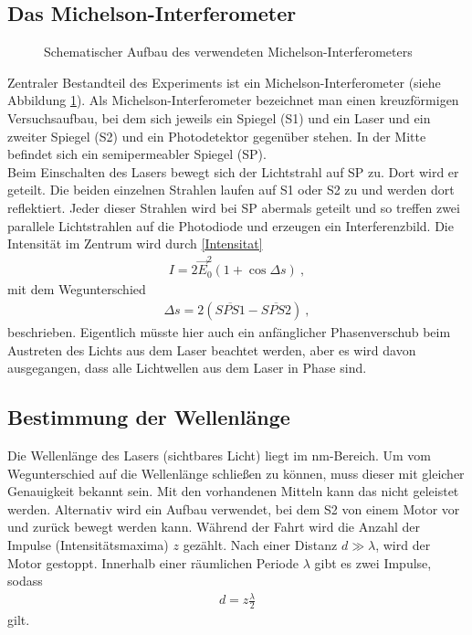\subsection*{Das Michelson-Interferometer}
\begin{figure}[h!]
	\centering
	
	\caption{Schematischer Aufbau des verwendeten Michelson-Interferometers}
	\label{fig:Interferometer}
\end{figure}
Zentraler Bestandteil des Experiments ist ein Michelson-Interferometer (siehe Abbildung \ref{fig:Interferometer}). Als Michelson-Interferometer bezeichnet man einen kreuzförmigen Versuchsaufbau, bei dem sich jeweils ein Spiegel (S1) und ein Laser und ein zweiter Spiegel (S2) und ein Photodetektor gegenüber stehen. In der Mitte befindet sich ein semipermeabler Spiegel (SP). \\
Beim Einschalten des Lasers bewegt sich der Lichtstrahl auf SP zu. Dort wird er geteilt. Die beiden einzelnen Strahlen laufen auf S1 oder S2 zu und werden dort reflektiert. Jeder dieser Strahlen wird bei SP abermals geteilt und so treffen zwei parallele Lichtstrahlen auf die Photodiode und erzeugen ein Interferenzbild. Die Intensität im Zentrum wird durch \eqref{Intensitat}
\begin{align}
	I = 2\vec{E}_0^2\left(1+\cos\Delta s\right) \ ,
\end{align}
mit dem Wegunterschied
\begin{align}
	\Delta s = 2(\overline{SPS1}-\overline{SPS2}) \ ,
\end{align}
beschrieben. Eigentlich müsste hier auch ein anfänglicher Phasenverschub beim Austreten des Lichts aus dem Laser beachtet werden, aber es wird davon ausgegangen, dass alle Lichtwellen aus dem Laser in Phase sind.
\clearpage
\subsection*{Bestimmung der Wellenlänge}
Die Wellenlänge des Lasers (sichtbares Licht) liegt im \si{nm}-Bereich. Um vom Wegunterschied auf die Wellenlänge schließen zu können, muss dieser mit gleicher Genauigkeit bekannt sein. Mit den vorhandenen Mitteln kann das nicht geleistet werden. Alternativ wird ein Aufbau verwendet, bei dem S2 von einem Motor vor und zurück bewegt werden kann. Während der Fahrt wird die Anzahl der Impulse (Intensitätsmaxima) $z$ gezählt. Nach einer Distanz $d \gg \lambda$, wird der Motor gestoppt. Innerhalb einer räumlichen Periode $\lambda$ gibt es zwei Impulse, sodass
\begin{align}\label{Wellenlange}
	d = z\frac{\lambda}{2}
\end{align}
gilt.

